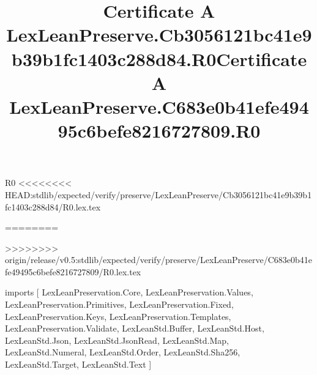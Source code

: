 \begin{lexlean}{R0}
<<<<<<<< HEAD:stdlib/expected/verify/preserve/LexLeanPreserve/Cb3056121bc41e9b39b1fc1403c288d84/R0.lex.tex
\title{Certificate A LexLeanPreserve.Cb3056121bc41e9b39b1fc1403c288d84.R0}
========
\title{Certificate A LexLeanPreserve.C683e0b41efe49495c6befe8216727809.R0}
>>>>>>>> origin/release/v0.5:stdlib/expected/verify/preserve/LexLeanPreserve/C683e0b41efe49495c6befe8216727809/R0.lex.tex
\begin{coremodule}
imports [
  LexLeanPreservation.Core,
  LexLeanPreservation.Values,
  LexLeanPreservation.Primitives,
  LexLeanPreservation.Fixed,
  LexLeanPreservation.Keys,
  LexLeanPreservation.Templates,
  LexLeanPreservation.Validate,
  LexLeanStd.Buffer,
  LexLeanStd.Host,
  LexLeanStd.Json,
  LexLeanStd.JsonRead,
  LexLeanStd.Map,
  LexLeanStd.Numeral,
  LexLeanStd.Order,
  LexLeanStd.Sha256,
  LexLeanStd.Target,
  LexLeanStd.Text
]


\end{coremodule}
\end{lexlean}
